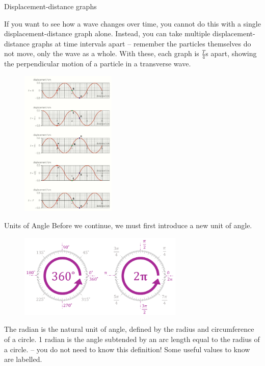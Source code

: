 \documentclass[../Main.tex]{subfiles}
\begin{document}
\begin{frame}{Displacement-distance graphs}
\begin{multicols}{2}
    If you want to see how a wave changes over time, you cannot do this with a single displacement-distance graph alone. 
    \newline \newline
    Instead, you can take multiple displacement-distance graphs at time intervals apart -- remember the particles themselves do not move, only the wave as a whole. 
        \newline \newline
    With these, each graph is $\frac{T}{4}$s apart, showing the perpendicular motion of a particle in a transverse wave.
    \columnbreak
    \begin{figure}
        \centering
        \includegraphics[height=7cm]{Waves_Images/displacement_distance_time_snapshots.png}
    \end{figure}
    \end{multicols}
\end{frame}
\begin{frame}{Units of Angle}
    Before we continue, we must first introduce a new unit of angle. 
    \begin{figure}
        \centering
        \includegraphics[height=4cm]{Waves_Images/radians.png}
    \end{figure}
    The radian is the natural unit of angle, defined by the radius and circumference of a circle. 1 radian is the angle subtended by an arc length equal to the radius of a circle. -- you do not need to know this definition!
    \newline \newline
    Some useful values to know are labelled.
\end{frame}
\end{document}
